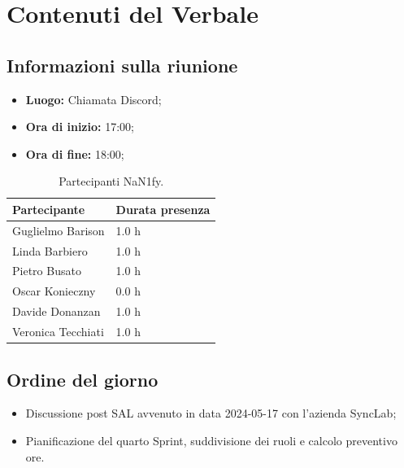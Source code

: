 \documentclass[8pt]{article}
\begin{document}
\section{Contenuti del Verbale}
\subsection{Informazioni sulla riunione}
\begin{itemize}
	\setlength\itemsep{0em}
	\item\textbf{Luogo:} Chiamata Discord;
	\item\textbf{Ora di inizio:} 17:00;
  \item\textbf{Ora di fine:}  18:00;
\end{itemize}
\begin{table}[ht!]
	\begin{minipage}[t]{0.5\linewidth}
		\centering
		\begin{tabular}{p{3cm} p{3cm}}
			\toprule
			\textbf{Partecipante} & \textbf{Durata presenza} \\
			\midrule
			Guglielmo Barison & 1.0 h \\
			Linda Barbiero &  1.0 h \\
			Pietro Busato & 1.0 h \\
			Oscar Konieczny & 0.0 h \\
			Davide Donanzan & 1.0 h \\
			Veronica Tecchiati & 1.0 h \\
			\bottomrule
		\end{tabular}
		\caption{Partecipanti NaN1fy.}
		\label{table:Partecipanti NaN1fy}
	\end{minipage} 
\end{table}
\subsection{Ordine del giorno}
\begin{itemize}
	\setlength\itemsep{0em}
    \item Discussione post SAL avvenuto in data 2024-05-17 con l'azienda SyncLab;
	\item Pianificazione del quarto Sprint, suddivisione dei ruoli e calcolo preventivo ore.
\end{itemize}
\end{document}
